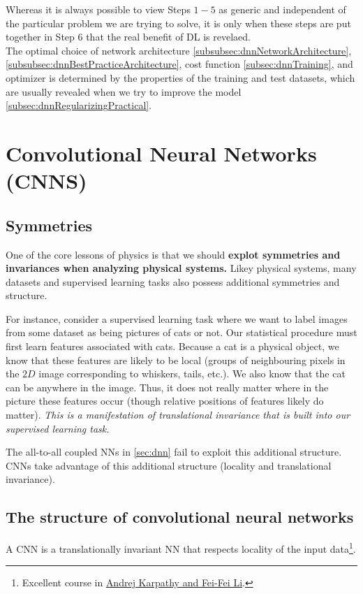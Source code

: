 Whereas it is always possible to view Steps $1-5$ as generic and independent of the particular problem we are trying to solve, it is only when these steps are put together in Step $6$ that the real benefit of DL is revelaed.\\
The optimal choice of network architecture \ref{subsubsec:dnnNetworkArchitecture},\ref{subsubsec:dnnBestPracticeArchitecture}, cost function \ref{subsec:dnnTraining}, and optimizer is determined by the properties of the training and test datasets, which are usually revealed when we try to improve the model \ref{subsec:dnnRegularizingPractical}.



\section{Convolutional Neural Networks (CNNS)}
\label{sec:cnn}
\subsection{Symmetries}
\label{subsec:cnnSymmetries}
One of the core lessons of physics is that we should \textbf{explot symmetries and invariances when analyzing physical systems.} Likey physical systems, many datasets and supervised learning tasks also possess additional symmetries and structure. 
\begin{example}
For instance, consider a supervised learning task where we want to label images from some dataset as being pictures of cats or not. Our statistical procedure must first learn features associated with cats. Because a cat is a physical object, we know that these features are likely to be local (groups of neighbouring pixels in the $2D$ image corresponding to whiskers, tails, etc.). We also know that the cat can be anywhere in the image. Thus, it does not really matter where in the picture these features occur (though relative positions of features likely do matter). \emph{This is a manifestation of translational invariance that is built into our supervised learning task.}
\end{example}
The all-to-all coupled NNs in \ref{sec:dnn} fail to exploit this additional structure. CNNs take advantage of this additional structure (locality and translational invariance). 








\subsection{The structure of convolutional neural networks}
\label{subsec:cnnStructure}
A CNN is a translationally invariant NN that respects locality of the input data\footnote{Excellent course in \href{https://cs231n.github.io/}{Andrej Karpathy and Fei-Fei Li}.}.
